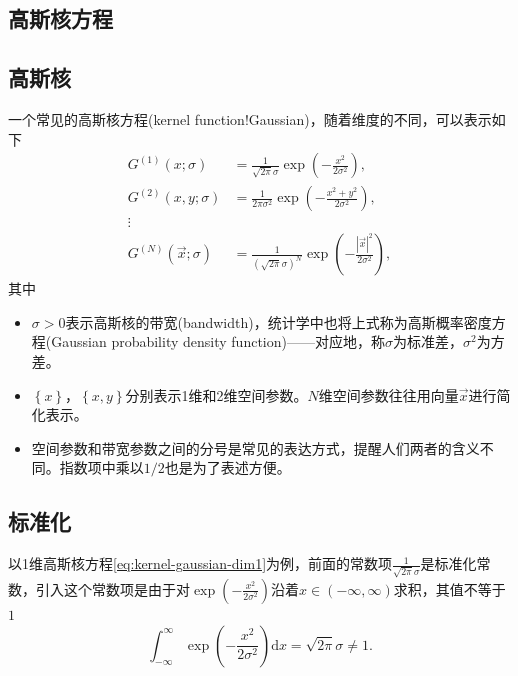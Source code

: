 \begin{subappendices}
\section{高斯核方程}
\label{sec:kernel-analysis}

\subsection{高斯核}
\label{sec:kernel-gaussian}
一个常见的高斯核方程(kernel function!Gaussian)，随着维度的不同，可以表示如下
\begin{align}
  \label{eq:kernel-gaussian-dim1}
  G^{(1)} \left( x ; \sigma \right) & = \frac{1}{\sqrt{2 \pi} \sigma}
  \exp \left( - \frac{x^{2}}{2 \sigma^{2}} \right), \\
  \label{eq:kernel-gaussian-dim2}
  G^{(2)} \left( x,y; \sigma \right)
  & = \frac{1}{2 \pi \sigma^{2}}
  \exp \left(  - \frac{x^{2} + y^{2}}{2 \sigma^{2}} \right), \\
  \vdots & \nonumber \\
  \label{eq:kernel-gaussian-dimN}
  G^{(N)} \left( \vec{x} ; \sigma \right)
  & = \frac{1}{\left(\sqrt{2 \pi} \sigma \right)^{N}}
  \exp \left(
  - \frac{
  \left| \vec{x} \right|^{2}
  }{
  2 \sigma^{2}
  }
  \right),
\end{align}
其中
\begin{itemize}
\item $\sigma > 0$表示高斯核的带宽(bandwidth)，统计学中也将上式称为高斯概率密度方程(Gaussian probability density function)——对应地，称$\sigma$为标准差，$\sigma^{2}$为方差。
\item $\left\{ x \right\}$，$\left\{ x,y \right\}$分别表示1维和2维空间参数。$N$维空间参数往往用向量$\vec{x}$进行简化表示。
\item 空间参数和带宽参数之间的分号是常见的表达方式，提醒人们两者的含义不同。指数项中乘以$1/2$也是为了表述方便。
\end{itemize}

\subsection{标准化}
\label{sec:kernel-gaussian-normalization}
以1维高斯核方程\eqref{eq:kernel-gaussian-dim1}为例，前面的常数项$\frac{1}{\sqrt{2 \pi} \sigma}$是标准化常数，引入这个常数项是由于对$\exp \left( - \frac{x^{2}}{2 \sigma^{2}} \right)$沿着$x \in \left( - \infty, \infty \right)$求积，其值不等于$1$
\begin{equation*}
  \int_{-\infty}^{\infty} \exp \left( -
  \frac{x^{2}}{2 \sigma^{2}}
  \right) \mathrm{d} x = \sqrt{2 \pi} \sigma \neq 1.
\end{equation*}


\end{subappendices}
